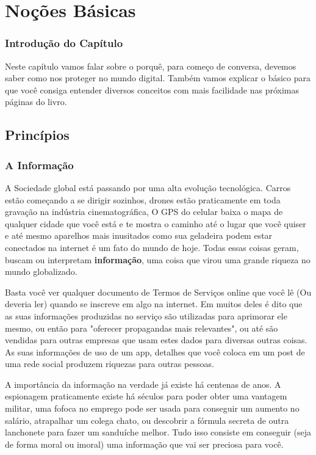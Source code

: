 \part{Noções Básicas}

\section{Introdução do Capítulo}

Neste capítulo vamos falar sobre o porquê, para começo de conversa, devemos saber como nos proteger no mundo digital. Também vamos explicar o básico para que você consiga entender diversos conceitos com mais facilidade nas próximas páginas do livro.

\chapter{Princípios}

\section{A Informação}

A Sociedade global está passando por uma alta evolução tecnológica. Carros estão começando a se dirigir sozinhos, drones estão praticamente em toda gravação na indústria cinematográfica, O GPS do celular baixa o mapa de qualquer cidade que você está e te mostra o caminho até o lugar que você quiser e até mesmo aparelhos mais inusitados como sua geladeira podem estar conectados na internet é um fato do mundo de hoje. Todas essas coisas geram, buscam ou interpretam \textbf{informação}, uma coisa que virou uma grande riqueza no mundo globalizado.

Basta você ver qualquer documento de Termos de Serviços online que você lê (Ou deveria ler) quando se inscreve em algo na internet. Em muitos deles é dito que as suas informações produzidas no serviço são utilizadas para aprimorar ele mesmo, ou então para "oferecer propagandas mais relevantes", ou até são vendidas para outras empresas que usam estes dados para diversas outras coisas. As suas informações de uso de um app, detalhes que você coloca em um post de uma rede social produzem riquezas para outras pessoas. 

A importância da informação na verdade já existe há centenas de anos. A espionagem praticamente existe há séculos para poder obter uma vantagem militar, uma fofoca no emprego pode ser usada para conseguir um aumento no salário, atrapalhar um colega chato, ou descobrir a fórmula secreta de outra lanchonete para fazer um sanduíche melhor. Tudo isso consiste em conseguir (seja de forma moral ou imoral) uma informação que vai ser preciosa para você.


